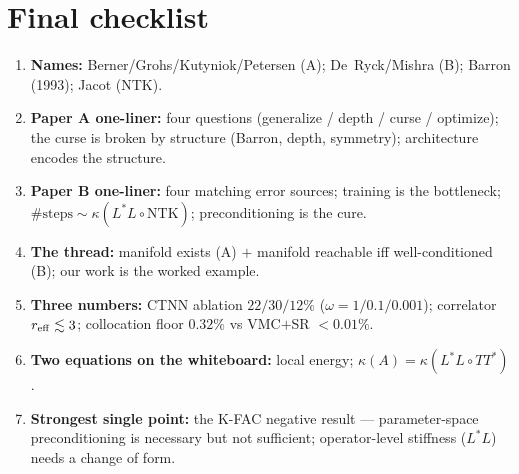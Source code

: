 \documentclass[11pt]{article}
\begin{document}
\section*{Final checklist}
\begin{enumerate}[leftmargin=*]
\item \textbf{Names:} Berner/Grohs/Kutyniok/Petersen (A); De~Ryck/Mishra (B); Barron (1993);
Jacot (NTK).
\item \textbf{Paper A one-liner:} four questions (generalize / depth / curse / optimize); the curse is
broken by structure (Barron, depth, symmetry); architecture encodes the structure.
\item \textbf{Paper B one-liner:} four matching error sources; training is the bottleneck;
$\#\text{steps}\sim\kappa(L^\ast L\circ\text{NTK})$; preconditioning is the cure.
\item \textbf{The thread:} manifold exists (A) $+$ manifold reachable iff well-conditioned (B); our
work is the worked example.
\item \textbf{Three numbers:} CTNN ablation $22/30/12\%$ ($\omega=1/0.1/0.001$); correlator
$r_{\rm eff}\lesssim3$; collocation floor $0.32\%$ vs VMC$+$SR $<0.01\%$.
\item \textbf{Two equations on the whiteboard:} local energy; $\kappa(A)=\kappa(L^\ast L\circ TT^\ast)$.
\item \textbf{Strongest single point:} the K-FAC negative result --- parameter-space preconditioning
is necessary but not sufficient; operator-level stiffness ($L^\ast L$) needs a change of form.
\end{enumerate}
\end{document}
